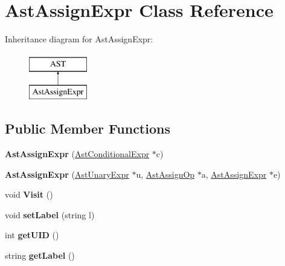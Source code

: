 \hypertarget{classAstAssignExpr}{\section{Ast\-Assign\-Expr Class Reference}
\label{classAstAssignExpr}
}
Inheritance diagram for Ast\-Assign\-Expr\-:\begin{figure}[H]
\begin{center}
\leavevmode
\includegraphics[height=2.000000cm]{classAstAssignExpr}
\end{center}
\end{figure}
\subsection*{Public Member Functions}
\begin{DoxyCompactItemize}
\item 
\hypertarget{classAstAssignExpr_adcf8fd9d2e80a579e8fad5ae28c79211}{{\bfseries Ast\-Assign\-Expr} (\hyperlink{classAstConditionalExpr}{Ast\-Conditional\-Expr} $\ast$c)}\label{classAstAssignExpr_adcf8fd9d2e80a579e8fad5ae28c79211}

\item 
\hypertarget{classAstAssignExpr_abbbd7c531a5c6fdecde141f46699f375}{{\bfseries Ast\-Assign\-Expr} (\hyperlink{classAstUnaryExpr}{Ast\-Unary\-Expr} $\ast$u, \hyperlink{classAstAssignOp}{Ast\-Assign\-Op} $\ast$a, \hyperlink{classAstAssignExpr}{Ast\-Assign\-Expr} $\ast$e)}\label{classAstAssignExpr_abbbd7c531a5c6fdecde141f46699f375}

\item 
\hypertarget{classAstAssignExpr_a7e86da39b9d65e34a16314c0927b78d9}{void {\bfseries Visit} ()}\label{classAstAssignExpr_a7e86da39b9d65e34a16314c0927b78d9}

\item 
\hypertarget{classAST_a71d680856e95ff89f55d5311a552eba6}{void {\bfseries set\-Label} (string l)}\label{classAST_a71d680856e95ff89f55d5311a552eba6}

\item 
\hypertarget{classAST_ab7a5b1d9f1c2de0d98deb356f724a42c}{int {\bfseries get\-U\-I\-D} ()}\label{classAST_ab7a5b1d9f1c2de0d98deb356f724a42c}

\item 
\hypertarget{classAST_aee029be902fffc927d16ccb03eb922ad}{string {\bfseries get\-Label} ()}\label{classAST_aee029be902fffc927d16ccb03eb922ad}

\end{DoxyCompactItemize}
